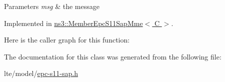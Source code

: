 \begin{DoxyParams}{Parameters}
{\em msg} & the message \\
\hline
\end{DoxyParams}


Implemented in \hyperlink{classns3_1_1MemberEpcS11SapMme_a6d3f244a615532f1b9499c923c5bed19}{ns3\+::\+Member\+Epc\+S11\+Sap\+Mme$<$ C $>$}.



Here is the caller graph for this function\+:




The documentation for this class was generated from the following file\+:\begin{DoxyCompactItemize}
\item 
lte/model/\hyperlink{epc-s11-sap_8h}{epc-\/s11-\/sap.\+h}\end{DoxyCompactItemize}
